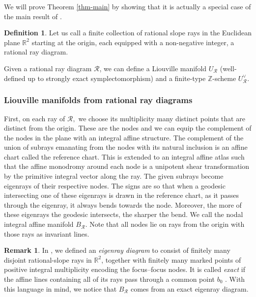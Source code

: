 \documentclass[11pt, reqno]{amsart}
\theoremstyle{definition}
\newtheorem{definition}[theorem]{Definition}
\newtheorem{remark}[theorem]{Remark}
\begin{document}
We will prove Theorem \ref{thm-main} by showing that it is actually a special case of the main result of \cite{HK22}.

\begin{definition}
    Let us call a finite collection of rational slope rays in the Euclidean plane $\mathbb{R}^2$ starting at the origin, each equipped with a non-negative integer, a rational ray diagram. 
\end{definition}

Given a rational ray diagram $\mathcal{R}$, we can define a Liouville manifold $U_\mathcal{R}$ (well-defined up to strongly exact symplectomorphism) and a finite-type $\mathbb{Z}$-scheme $U^\vee_\mathcal{R}$. 

\subsubsection{Liouville manifolds from rational ray diagrams}
First, on each ray of $\mathcal{R},$ we choose its multiplicity many distinct points that are distinct from the origin. These are the nodes and we can equip the complement of the nodes in the plane with an integral affine structure. The complement of the union of subrays emanating from the nodes with its natural inclusion is an affine chart called the reference chart. This is extended to an integral affine atlas such that the affine monodromy around each node is a unipotent shear transformation by the primitive integral vector along the ray. The given subrays become eigenrays of their respective nodes. The signs are so that when a geodesic intersecting one of these eigenrays is drawn in the reference chart, as it passes through the eigenray, it always bends towards the node. Moreover, the more of these eigenrays the geodesic intersects, the sharper the bend. We call the nodal integral affine manifold $B_\mathcal{R}$. Note that all nodes lie on rays from the origin with those rays as invariant lines. 

\begin{remark}
    In \cite{GV23}, we defined an \emph{eigenray diagram} to consist of finitely many disjoint rational-slope rays in $\mathbb{R}^{2}$, together with finitely many marked points of positive integral multiplicity encoding the focus--focus nodes. It is called \emph{exact} if the affine lines containing all of its rays pass through a common point $b_{0}$ \cite[Remark~1.10]{GV23}. With this language in mind, we notice that $B_\mathcal{R}$ comes from an exact eigenray diagram.  
\end{remark}
\end{document}
